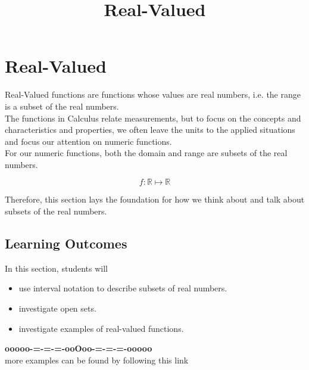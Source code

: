 \documentclass{ximera}
\title{Real-Valued}
\begin{document}
\begin{abstract}
\end{abstract}
\maketitle




\section{Real-Valued}


Real-Valued functions are functions whose values are real numbers, i.e. the range is a subset of the real numbers. \\


The functions in Calculus relate measurements, but to focus on the concepts and characteristics and properties, we often leave the units to the applied situations and focus our attention on numeric functions. \\


For our numeric functions, both the domain and range are subsets of the real numbers. 

\[
f : \mathbb{R} \mapsto \mathbb{R}
\]


Therefore, this section lays the foundation for how we think about and talk about subsets of the real numbers.










\subsection{Learning Outcomes}





\begin{sectionOutcomes}
In this section, students will 

\begin{itemize}
\item use interval notation to describe subsets of real numbers.
\item investigate open sets.
\item investigate examples of real-valued functions.
\end{itemize}
\end{sectionOutcomes}










\begin{center}
\textbf{\textcolor{green!50!black}{ooooo-=-=-=-ooOoo-=-=-=-ooooo}} \\

more examples can be found by following this link\\ 

\end{center}
\end{document}
